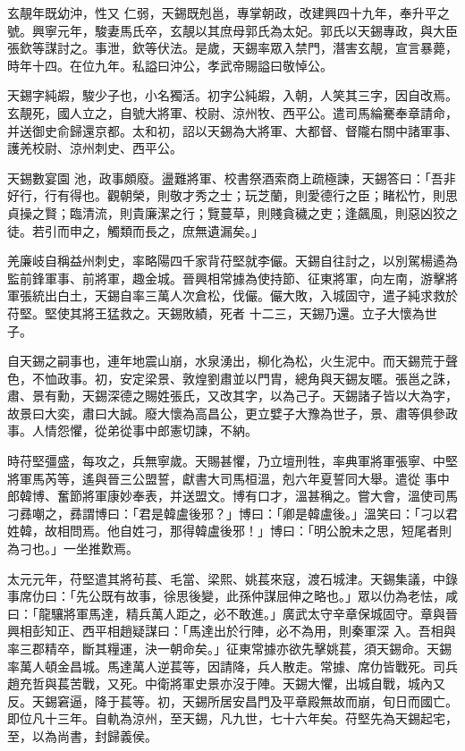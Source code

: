 \begin{pinyinscope}
 玄靚年既幼沖，性又
 仁弱，天錫既剋邕，專掌朝政，改建興四十九年，奉升平之號。興寧元年，駿妻馬氏卒，玄靚以其庶母郭氏為太妃。郭氏以天錫專政，與大臣張欽等謀討之。事泄，欽等伏法。是歲，天錫率眾入禁門，潛害玄靚，宣言暴薨，時年十四。在位九年。私謚曰沖公，孝武帝賜謚曰敬悼公。



 天錫字純嘏，駿少子也，小名獨活。初字公純嘏，入朝，人笑其三字，因自改焉。玄靚死，國人立之，自號大將軍、校尉、涼州牧、西平公。遣司馬綸騫奉章請命，并送御史俞歸還京都。太和初，詔以天錫為大將軍、大都督、督隴右關中諸軍事、護羌校尉、涼州刺史、西平公。



 天錫數宴園
 池，政事頗廢。盪難將軍、校書祭酒索商上疏極諫，天錫答曰：「吾非好行，行有得也。觀朝榮，則敬才秀之士；玩芝蘭，則愛德行之臣；睹松竹，則思貞操之賢；臨清流，則貴廉潔之行；覽蔓草，則賤貪穢之吏；逢飆風，則惡凶狡之徒。若引而申之，觸類而長之，庶無遺漏矣。」



 羌廉岐自稱益州刺史，率略陽四千家背苻堅就李儼。天錫自往討之，以別駕楊遹為監前鋒軍事、前將軍，趣金城。晉興相常據為使持節、征東將軍，向左南，游擊將軍張統出白土，天錫自率三萬人次倉松，伐儼。儼大敗，入城固守，遣子純求救於苻堅。堅使其將王猛救之。天錫敗績，死者
 十二三，天錫乃還。立子大懷為世子。



 自天錫之嗣事也，連年地震山崩，水泉湧出，柳化為松，火生泥中。而天錫荒于聲色，不恤政事。初，安定梁景、敦煌劉肅並以門胄，總角與天錫友暱。張邕之誅，肅、景有勳，天錫深德之賜姓張氏，又改其字，以為己子。天錫諸子皆以大為字，故景曰大奕，肅曰大誠。廢大懷為高昌公，更立嬖子大豫為世子，景、肅等俱參政事。人情怨懼，從弟從事中郎憲切諫，不納。



 時苻堅彊盛，每攻之，兵無寧歲。天賜甚懼，乃立壇刑牲，率典軍將軍張寧、中堅將軍馬芮等，遙與晉三公盟誓，獻書大司馬桓溫，剋六年夏誓同大舉。遣從
 事中郎韓博、奮節將軍康妙奉表，并送盟文。博有口才，溫甚稱之。嘗大會，溫使司馬刁彞嘲之，彞謂博曰：「君是韓盧後邪？」博曰：「卿是韓盧後。」溫笑曰：「刁以君姓韓，故相問焉。他自姓刁，那得韓盧後邪！」博曰：「明公脫未之思，短尾者則為刁也。」一坐推歎焉。



 太元元年，苻堅遣其將茍萇、毛當、梁熙、姚萇來寇，渡石城津。天錫集議，中錄事席仂曰：「先公既有故事，徐思後變，此孫仲謀屈伸之略也。」眾以仂為老怯，咸曰：「龍驤將軍馬達，精兵萬人距之，必不敢進。」廣武太守辛章保城固守。章與晉興相彭知正、西平相趙疑謀曰：「馬達出於行陣，必不為用，則秦軍深
 入。吾相與率三郡精卒，斷其糧運，決一朝命矣。」征東常據亦欲先擊姚萇，須天錫命。天錫率萬人頓金昌城。馬達萬人逆萇等，因請降，兵人散走。常據、席仂皆戰死。司兵趙充哲與萇苦戰，又死。中衛將軍史景亦沒于陣。天錫大懼，出城自戰，城內又反。天錫窘逼，降于萇等。初，天錫所居安昌門及平章殿無故而崩，旬日而國亡。即位凡十三年。自軌為涼州，至天錫，凡九世，七十六年矣。苻堅先為天錫起宅，至，以為尚書，封歸義侯。




\end{pinyinscope}
